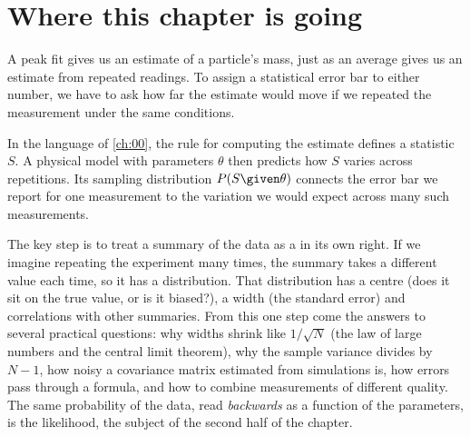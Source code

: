 \providecommand{\ThreeARatioBHalf}{}\renewcommand{\ThreeARatioBHalf}{1.294}
\providecommand{\ThreeARatioBMed}{}\renewcommand{\ThreeARatioBMed}{3.329}
\providecommand{\ThreeARatioBNeg}{}\renewcommand{\ThreeARatioBNeg}{0.001363}
\providecommand{\ThreeARatioBFar}{}\renewcommand{\ThreeARatioBFar}{0.02883}
\providecommand{\ThreeARatioCLin}{}\renewcommand{\ThreeARatioCLin}{10.05}
\providecommand{\ThreeARatioCHalf}{}\renewcommand{\ThreeARatioCHalf}{11.49}
\providecommand{\ThreeARatioCMed}{}\renewcommand{\ThreeARatioCMed}{7.083}
\providecommand{\ThreeARatioCNeg}{}\renewcommand{\ThreeARatioCNeg}{0.1589}
\providecommand{\ThreeARatioCFar}{}\renewcommand{\ThreeARatioCFar}{0.0961}
\providecommand{\ThreeAWsdW}{}\renewcommand{\ThreeAWsdW}{0.3391}
\providecommand{\ThreeAWsdWth}{}\renewcommand{\ThreeAWsdWth}{0.339}
\providecommand{\ThreeAWsdU}{}\renewcommand{\ThreeAWsdU}{0.6228}
\providecommand{\ThreeAWsdUth}{}\renewcommand{\ThreeAWsdUth}{0.621}
\providecommand{\ThreeAWchiMean}{}\renewcommand{\ThreeAWchiMean}{6.998}
\providecommand{\ThreeAWchiVar}{}\renewcommand{\ThreeAWchiVar}{14.05}
\providecommand{\ThreeAWbest}{}\renewcommand{\ThreeAWbest}{0.5}
\providecommand{\ThreeACorrVmcNine}{}\renewcommand{\ThreeACorrVmcNine}{0.5453}
\providecommand{\ThreeACorrVthNine}{}\renewcommand{\ThreeACorrVthNine}{0.5429}
 
\section*{Where this chapter is going}
\label{3a:sec:roadmap}

A peak fit gives us an estimate of a particle's mass, just as an average
gives us an estimate from repeated readings. To assign a statistical error
bar to either number, we have to ask how far the estimate would move if we
repeated the measurement under the same conditions.

In the language of \cref{ch:00}, the rule for computing the estimate defines
a statistic $S$. A physical model with parameters $\theta$ then predicts how
$S$ varies across repetitions. Its sampling distribution $P(S\given\theta)$
connects the error bar we report for one measurement to the variation we
would expect across many such measurements.

The key step is to treat a summary of the data as a 
in its own right. If we imagine repeating the experiment many times, the
summary takes a different value each time, so it has a distribution. That
distribution has a centre (does it sit on the true value, or is it biased?),
a width (the standard error) and correlations with other summaries. From this
one step come the answers to several practical questions: why widths shrink
like $1/\sqrt N$ (the law of large numbers and the central limit theorem), why
the sample variance divides by $N-1$, how noisy a covariance matrix estimated
from simulations is, how errors pass through a formula, and how to combine
measurements of different quality. The same probability of the data, read
\emph{backwards} as a function of the parameters, is the likelihood, the
subject of the second half of the chapter.

